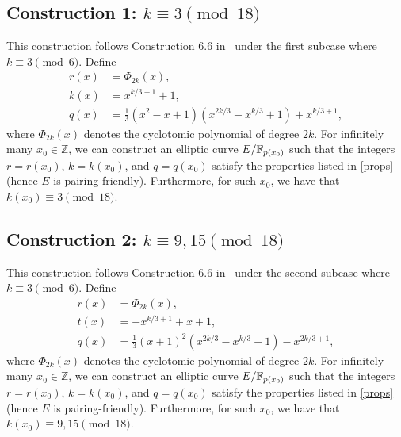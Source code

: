 \subsection{Construction 1: $k \equiv 3 \pmod{18}$}
This construction follows Construction 6.6 in~\cite{2010/freeman}
under the first subcase where $k \equiv 3 \pmod{6}$.
Define
\begin{align*}
r(x) &= \Phi_{2k}(x),	\\
k(x) &= x^{k/3+1} + 1,	\\
q(x) &= \frac{1}{3} (x^2 - x + 1) (x^{2k/3} - x^{k/3} + 1) + x^{k/3+1},
\end{align*}
where $\Phi_{2k}(x)$ denotes the cyclotomic polynomial of degree $2k$. For infinitely many $x_{0}\in \mathbb{Z}$, we can construct an elliptic curve $E/\mathbb{F}_{p(x_{0})}$ such that the integers $r=r(x_{0})$, $k=k(x_{0})$, and $q=q(x_{0})$ satisfy the properties listed in \ref{props} (hence $E$ is pairing-friendly). Furthermore, for such $x_{0}$, we have that $k(x_{0}) \equiv 3 \pmod{18}$.


\subsection{Construction 2: $k \equiv 9,15 \pmod{18}$}
This construction follows Construction 6.6 in~\cite{2010/freeman}
under the second subcase where $k \equiv 3 \pmod{6}$.
Define
\begin{align*}
r(x) &= \Phi_{2k}(x),	\\
t(x) &= -x^{k/3+1} + x + 1,	\\
q(x) &= \frac{1}{3} (x+1)^2 (x^{2k/3} - x^{k/3} + 1) - x^{2k/3+1},
\end{align*}
where $\Phi_{2k}(x)$ denotes the cyclotomic polynomial of degree $2k$. For infinitely many $x_{0}\in \mathbb{Z}$, we can construct an elliptic curve $E/\mathbb{F}_{p(x_{0})}$ such that the integers $r=r(x_{0})$, $k=k(x_{0})$, and $q=q(x_{0})$ satisfy the properties listed in \ref{props} (hence $E$ is pairing-friendly). Furthermore, for such $x_{0}$, we have that
$k(x_{0}) \equiv 9,15 \pmod{18}$.


